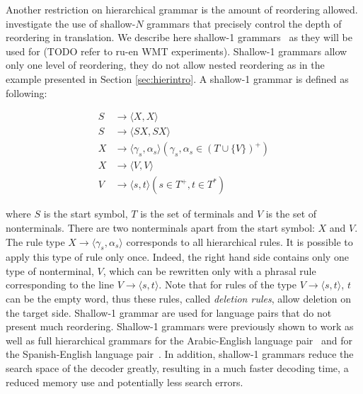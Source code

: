   Another restriction on hierarchical grammar is the amount of reordering allowed. \citet{degispert-iglesias-blackwood-banga-byrne:2010:CL} investigate the use
  of shallow-$N$ grammars that precisely control the depth of reordering in translation. We describe here 
  shallow-1 grammars~\citep{iglesias-degispert-banga-byrne:2009:EACL,degispert-iglesias-blackwood-banga-byrne:2010:CL} as
  they will be used for (TODO refer to ru-en WMT experiments). Shallow-1 grammars
  allow only one level of reordering, they do not allow nested reordering as in the example presented in Section \ref{sec:hierintro}. A shallow-1
  grammar is defined as following:
  
  \begin{align*}
    S &\rightarrow \langle X , X \rangle \\
    S &\rightarrow \langle S X , S X \rangle \\
    X &\rightarrow \langle \gamma_s , \alpha_s \rangle (\gamma_s, \alpha_s \in (T \cup \{V\})^{+}) \\
    X &\rightarrow \langle V , V \rangle \\
    V &\rightarrow \langle s , t \rangle (s \in T^{+}, t \in  T^{*})
  \end{align*}
  
  \noindent where $S$ is the start symbol, $T$ is the set of terminals and $V$ is the set of nonterminals. There are two nonterminals
  apart from the start symbol: $X$ and $V$. The rule type $X \rightarrow \langle \gamma_s , \alpha_s \rangle$ corresponds
  to all hierarchical rules. It is possible to apply this type of rule only once. Indeed, the
  right hand side contains only one type of nonterminal, $V$, which can be rewritten only with a phrasal rule corresponding
  to the line $V \rightarrow \langle s , t \rangle$. Note that for rules of the type $V \rightarrow \langle s , t \rangle$, $t$ can be
  the empty word, thus these rules, called {\em deletion rules}, allow deletion on the target side. Shallow-1 grammar are used for language pairs that do not present
  much reordering. Shallow-1 grammars were previously shown to work as well as full hierarchical grammars
  for the Arabic-English language pair~\citep{iglesias-degispert-banga-byrne:2009:EACL} and for
  the Spanish-English language pair~\citep{iglesias-degispert-banga-byrne:2009:SEPLN}.
  In addition, shallow-1 grammars reduce the search space of the decoder greatly, resulting in a much faster decoding
  time, a reduced memory use and potentially less search errors.

